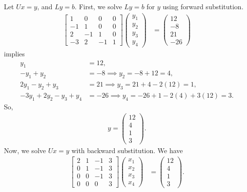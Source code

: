 \documentclass{report}
\begin{document}
    Let $ Ux = y$, and $Ly = b$. First, we solve $Ly = b$ for $y$ using forward substitution. 
    \begin{align*}
        \begin{bmatrix} 1 & 0& 0 & 0 \\ -1 & 1 & 0& 0 \\ 2 & -1 & 1 & 0\\ -3 & 2 & -1 & 1 \end{bmatrix} \begin{pmatrix} y_{1} \\ y_{2} \\ y_{3} \\ y_{4}  \end{pmatrix} &= \begin{pmatrix} 12 \\ -8 \\ 21 \\ -26 \end{pmatrix}
    \end{align*}
    implies
    \begin{align*}
        y_{1} &= 12, \\
        -y_{1} + y_{2} &= -8 \implies y_{2} = -8 + 12 = 4, \\
        2y_{1} - y_{2} + y_{3} &= 21 \implies y_{3} = 21 + 4 - 2(12) = 1, \\
        -3y_{1} + 2y_{2} - y_{3} + y_{4} &= -26 \implies y_{4} = -26 +1-2(4)+3(12) = 3
    .\end{align*}
    So,
    \begin{align*}
        y = \begin{pmatrix} 12 \\ 4 \\ 1 \\3 \end{pmatrix}
    .\end{align*}
    Now, we solve $Ux =y$ with backward substitution. We have
    \begin{align*}
        \begin{bmatrix} 2 & 1 & -1 & 3  \\ 0 & 1 & -1 & 3 \\ 0 & 0 & -1 & 3\\ 0 & 0 & 0 & 3 \end{bmatrix} \begin{pmatrix} x_{1} \\ x_{2} \\ x_{3} \\ x_{4} \end{pmatrix} &= \begin{pmatrix} 12 \\ 4\\ 1 \\3 \end{pmatrix}
    .\end{align*}
\end{document}
